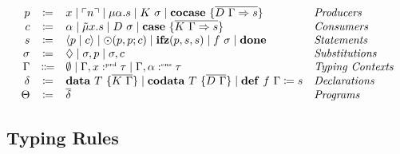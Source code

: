 \begin{definition}
    \[
      \begin{array}{rcll}
        p & \coloneqq & x \mid \lit{n} \mid \mu\alpha.s \mid K\ \sigma \mid \cocase{\overline{D\ \Gamma \Rightarrow s}} & \emph{Producers}\\
        c & \coloneqq & \alpha \mid \tilde{\mu}x.s \mid D\ \sigma \mid \case{\overline{K\ \Gamma \Rightarrow s}}& \emph{Consumers}\\
        s & \coloneqq & \cut{p}{c} \mid \odot(p, p; c) \mid \ifz{p}{s}{s} \mid f\ \sigma\mid \done & \emph{Statements}\\
        \sigma & \coloneqq & \nil \mid \sigma, p \mid \sigma, c & \emph{Substitutions}\\
        \Gamma & \Coloneqq & \emptyset \mid \Gamma, x \prd \tau \mid \Gamma, \alpha \cnt \tau & \emph{Typing Contexts} \\
        \delta & \coloneqq & \mathbf{data}\ T\ \{ \overline{K\ \Gamma} \} \mid \mathbf{codata}\ T\ \{ \overline{D\ \Gamma }\} \mid \defi{f\ \Gamma}{s} & \emph{Declarations}\\
       \Theta & \coloneqq & \overline{\delta} & \emph{Programs}\\
     \end{array}
    \]
  \end{definition}

\subsection{Typing Rules}
\label{subsec:core:typing-rules}


